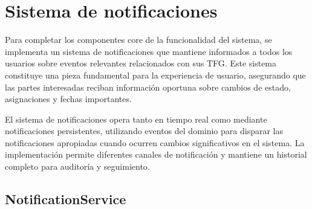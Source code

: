 \documentclass[12pt,a4paper,oneside]{report}
\begin{document}
\section{Sistema de notificaciones}\label{sistema-de-notificaciones}

Para completar los componentes core de la funcionalidad del sistema, se
implementa un sistema de notificaciones que mantiene informados a todos
los usuarios sobre eventos relevantes relacionados con sus TFG. Este
sistema constituye una pieza fundamental para la experiencia de usuario,
asegurando que las partes interesadas reciban información oportuna sobre
cambios de estado, asignaciones y fechas importantes.

El sistema de notificaciones opera tanto en tiempo real como mediante
notificaciones persistentes, utilizando eventos del dominio para
disparar las notificaciones apropiadas cuando ocurren cambios
significativos en el sistema. La implementación permite diferentes
canales de notificación y mantiene un historial completo para auditoría
y seguimiento.

\subsection{NotificationService}\label{notificationservice}
\end{document}
